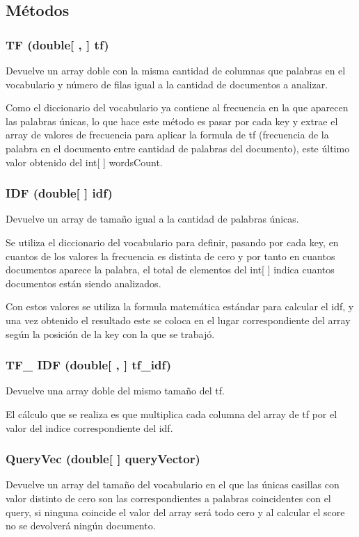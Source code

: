\documentclass[a4paper,12pt,]{article}
\begin{document}
\subsection*{Métodos}

\subsubsection*{TF (double[ , ] tf)}
Devuelve un array doble con la misma cantidad de columnas que palabras en el vocabulario y número de filas 
igual a la cantidad de documentos a analizar.

Como el diccionario del vocabulario ya contiene al frecuencia en la que aparecen las palabras únicas, lo que 
hace este método es pasar por cada key y extrae el array de valores de frecuencia para aplicar la formula de 
tf (frecuencia de la palabra en el documento entre cantidad de palabras del documento), este último valor 
obtenido del int[ ] wordsCount.

\subsubsection*{IDF (double[ ] idf)}
Devuelve un array de tamaño igual a la cantidad de palabras únicas.

Se utiliza el diccionario del vocabulario para definir, pasando por cada key, en cuantos de los valores la 
frecuencia es distinta de cero y por tanto en cuantos documentos aparece la palabra, el total de elementos del 
int[ ] indica cuantos documentos están siendo analizados.

Con estos valores se utiliza la formula matemática estándar para calcular el idf, y una vez obtenido el resultado 
este se coloca en el lugar correspondiente del array según la posición de la key con la que se trabajó.

\subsubsection*{TF\_ IDF (double[ , ] tf\_idf)}
Devuelve una array doble del mismo tamaño del tf.

El cálculo que se realiza es que multiplica cada columna del array de tf por el valor del indice correspondiente 
del idf.

\subsubsection*{QueryVec (double[ ] queryVector)}
Devuelve un array del tamaño del vocabulario en el que las únicas casillas con valor distinto de cero son las 
correspondientes a palabras coincidentes con el query, si ninguna coincide el valor del array será todo cero y 
al calcular el score no se devolverá ningún documento.
\end{document}
